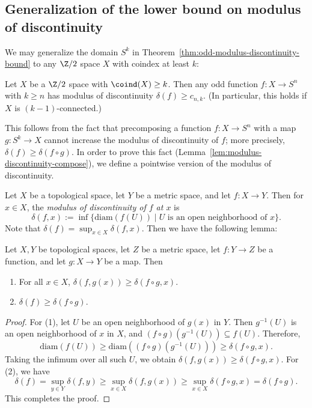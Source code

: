 \documentclass[11pt, reqno, english]{amsart}
\begin{document}
\subsection{Generalization of the lower bound on modulus of discontinuity}
\label{ssec:lower-bound-generalized}

We may generalize the domain $S^{k}$ in Theorem~\ref{thm:odd-modulus-discontinuity-bound} to any $\Z/2$ space $X$ with coindex at least $k$:

\begin{theorem}
\label{thm:odd-modulus-discontinuity-bound-generalized}
Let $X$ be a $\Z/2$ space with $\coind(X) \ge k$.
Then any odd function $f \colon X \to S^{n}$ with $k \ge n$ has modulus of discontinuity $\delta(f) \ge c_{n, k}$.
(In particular, this holds if $X$ is $(k - 1)$-connected.)
\end{theorem}

This follows from the fact that precomposing a function $f \colon X \to S^{n}$ with a map $g \colon S^{k} \to X$ cannot increase the modulus of discontinuity of $f$; more precisely, $\delta(f) \ge \delta(f \circ g)$.
In order to prove this fact (Lemma~\ref{lem:modulus-discontinuity-compose}), we define a pointwise version of the modulus of discontinuity.

Let $X$ be a topological space, let $Y$ be a metric space, and let $f \colon X \to Y$.
Then for $x \in X$, the \emph{modulus of discontinuity of $f$ at $x$} is
\begin{equation*}
\delta(f, x) := \inf\{\text{diam}(f(U)) \mid \text{$U$ is an open neighborhood of $x$}\}.
\end{equation*}
Note that $\delta(f) = \sup_{x \in X}\delta(f, x)$.
Then we have the following lemma:

\begin{lemma}
\label{lem:modulus-discontinuity-compose}
Let $X, Y$ be topological spaces, let $Z$ be a metric space, let $f \colon Y \to Z$ be a function, and let $g \colon X \to Y$ be a map.
Then
\begin{enumerate}
\item
For all $x \in X$, $\delta(f, g(x)) \ge \delta(f \circ g, x)$.
\item
$\delta(f) \ge \delta(f \circ g)$.
\end{enumerate}
\end{lemma}

\begin{proof}
For (1), let $U$ be an open neighborhood of $g(x)$ in $Y$.
Then $g^{-1}(U)$ is an open neighborhood of $x$ in $X$, and $(f \circ g)(g^{-1}(U)) \subseteq f(U)$.
Therefore,
$$\text{diam}(f(U)) \ge \text{diam}((f \circ g)(g^{-1}(U))) \ge \delta(f \circ g, x).$$
Taking the infimum over all such $U$, we obtain $\delta(f, g(x)) \ge \delta(f \circ g, x)$.
For (2), we have
$$\delta(f) = \sup_{y \in Y}\delta(f, y) \ge \sup_{x \in X}\delta(f, g(x)) \ge \sup_{x \in X}\delta(f \circ g, x) = \delta(f \circ g).$$
This completes the proof.
\end{proof}
\end{document}
